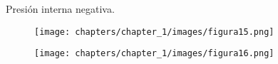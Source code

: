 \begin{enumerate}
\begin{itemize}
\newpage
Presión interna negativa.\\
\begin{figure}[H]
\begin{center}
     \texttt{[image: chapters/chapter\_1/images/figura15.png]}
\end{center}
\end{figure}

\begin{figure}[H]
\begin{center}
     \texttt{[image: chapters/chapter\_1/images/figura16.png]}
\end{center}
\end{figure}

\end{itemize}
\end{enumerate}

